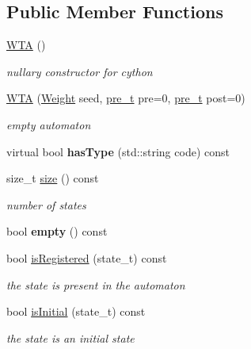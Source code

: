 \subsection*{Public Member Functions}
\begin{DoxyCompactItemize}
\item 
\mbox{\hyperlink{group__schemata_ga5636da911ebbe8772c5444172d56800d}{W\+TA}} ()
\begin{DoxyCompactList}\small\item\em nullary constructor for cython \end{DoxyCompactList}\item 
\mbox{\hyperlink{group__schemata_ga6eeb789b8c8aa8404f611a6fed61faca}{W\+TA}} (\mbox{\hyperlink{classWeight}{Weight}} seed, \mbox{\hyperlink{group__general_ga092fe8b972dfa977c2a0886720a7731e}{pre\+\_\+t}} pre=0, \mbox{\hyperlink{group__general_ga092fe8b972dfa977c2a0886720a7731e}{pre\+\_\+t}} post=0)
\begin{DoxyCompactList}\small\item\em empty automaton \end{DoxyCompactList}\item 
\mbox{\label{classWTA_a23060c851d5cf624215c2d9dc8ad4b45}} 
virtual bool {\bfseries has\+Type} (std\+::string code) const
\item 
size\+\_\+t \mbox{\hyperlink{group__schemata_gab201fee50d73843159cbef5f453838f0}{size}} () const
\begin{DoxyCompactList}\small\item\em number of states \end{DoxyCompactList}\item 
bool {\bfseries empty} () const
\item 
bool \mbox{\hyperlink{group__schemata_ga4459bd6654cbe35b39df9cade16c6d58}{is\+Registered}} (state\+\_\+t) const
\begin{DoxyCompactList}\small\item\em the state is present in the automaton \end{DoxyCompactList}\item 
bool \mbox{\hyperlink{group__schemata_ga88d07a1e47cc3ee537234861b7336dd6}{is\+Initial}} (state\+\_\+t) const
\begin{DoxyCompactList}\small\item\em the state is an initial state \end{DoxyCompactList}\item 
\mbox{\label{classWTA_ae6b10f70925f14f36b839e5d8657bc5e}} 

\end{DoxyCompactItemize}
